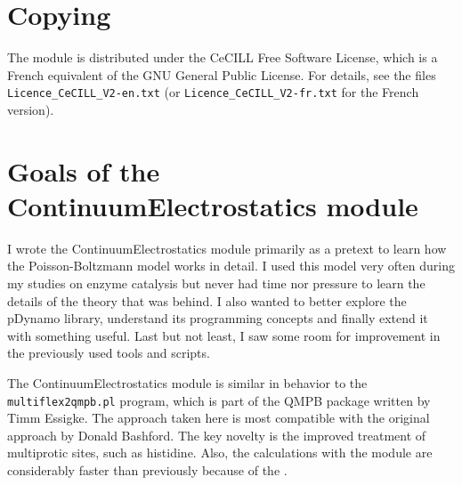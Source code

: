 \documentclass[a4paper,11pt]{article}
\newcommand{\modulename}{ContinuumElectrostatics\xspace}
\begin{document}
\section{Copying}
The module is distributed under the CeCILL Free Software License, which is
a French equivalent of the GNU General Public License.
%
For details, see the files \texttt{Licence\_CeCILL\_V2-en.txt} (or
\texttt{Licence\_CeCILL\_V2-fr.txt} for the French version).


\section{Goals of the \modulename module}
I wrote the \modulename module primarily as a pretext to learn how
the Poisson-Boltzmann model works in detail.
%
I used this model very often during my studies on enzyme catalysis but never had
time nor pressure to learn the details of the theory that was behind.
%
I also wanted to better explore the pDynamo library, understand its programming
concepts and finally extend it with something useful.
%
Last but not least, I saw some room for improvement in the previously used
tools and scripts.

The \modulename module is similar in behavior to the \texttt{multiflex2qmpb.pl}
program, which is part of the QMPB package written by Timm Essigke\cite{Essigke_PhD}.
%
The approach taken here is most compatible with the original approach
by Donald Bashford\cite{Bashford1992}.
%
The key novelty is the improved treatment of multiprotic sites, 
such as histidine.
%
Also, the calculations with the \makebox{\modulename} module are considerably faster 
than previously because of the .

%


\end{document}
